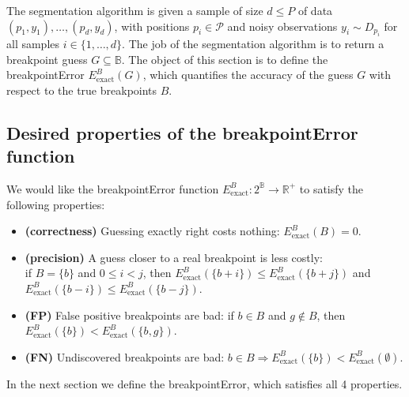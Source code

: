 \documentclass{jsfds} %
\newcommand{\RR}{\mathbb{R}}
\begin{document}
The segmentation algorithm is given a sample of size $d \leq P$ of
data $(p_1, y_1), \dots, (p_d, y_d)$, with positions $p_i\in\mathcal
P$ and noisy observations $y_i\sim D_{p_i}$ for all samples $i\in\{1,
\dots, d\}$. The job of the segmentation algorithm is to return a
breakpoint guess $G\subseteq \mathbb B$. The object of this section is to
define the breakpointError $E^B_{\text{exact}}(G)$, which quantifies
the accuracy of the guess $G$ with respect to the true breakpoints
$B$.

\subsection{Desired properties of the breakpointError function}
\label{sec:desired-properties}

We would like the breakpointError function $E^B_{\text{exact}}:
2^{\mathbb B}\rightarrow \RR^+$ to satisfy the following properties:

\begin{itemize}
\item \textbf{(correctness)} Guessing exactly right costs nothing:
  $E^B_{\text{exact}}(B)=0$.
\item \textbf{(precision)} A guess closer to a real breakpoint is less
  costly:\\if $B=\{b\}$ and $0\leq i<j$, then
  $E^B_{\text{exact}}(\{b+i\})\leq E^B_{\text{exact}}(\{b+j\})$ and
  $E^B_{\text{exact}}(\{b-i\})\leq E^B_{\text{exact}}(\{b-j\})$.
\item \textbf{(FP)} False positive breakpoints are
  bad: if $b\in B$ and $g\not\in B$, then $E^B_{\text{exact}} (\{b\}) <
  E^B_{\text{exact}} (\{b,g\})$.
\item \textbf{(FN)} Undiscovered breakpoints are bad:
  $b\in B\Rightarrow E^B_{\text{exact}}(\{b\}) < E^B_{\text{exact}} (\emptyset)$.
\end{itemize}

In the next section we define the breakpointError, which satisfies all
4 properties. 


\end{document}
